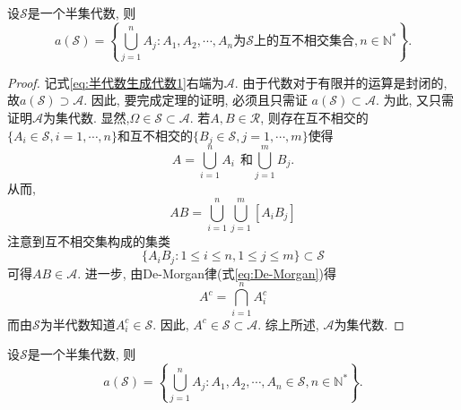 \begin{theorem}\label{thm:半代数生成代数1}
	设$\mathscr{S}$是一个半集代数, 则\begin{equation}\label{eq:半代数生成代数1}
	a(\mathscr{S}) = \left\{ \bigcup_{j=1}^nA_j: A_1,A_2,\cdots,A_n\text{为}\mathscr{S}\text{上的互不相交集合}, n\in\mathbb{N}^*  \right\}.
	\end{equation}
\end{theorem}

\begin{proof}
	记式\ref{eq:半代数生成代数1}右端为$\mathscr{A}$. 
	由于代数对于有限并的运算是封闭的, 故$a(\mathscr{S})\supset \mathscr{A}$. 因此, 要完成定理的证明, 必须且只需证 $a(\mathscr{S})\subset \mathscr{A}$. 为此, 又只需证明$\mathscr{A}$为集代数. 显然,$\Omega\in\mathscr{S}\subset\mathscr{A}$. 若$A,B\in\mathscr{R}$, 则存在互不相交的$\{A_i\in\mathscr{S},i=1,\cdots,n  \}$和互不相交的$\{B_j\in\mathscr{S},j=1,\cdots,m \}$使得
	\begin{equation}
	A = \bigcup_{i=1}^{n}A_i~~\text{和}\bigcup_{j=1}^{m}B_j.
	\end{equation}
	从而, \begin{equation}
		AB = \bigcup_{i=1}^n\bigcup_{j=1}^m[A_iB_j]
	\end{equation}
	注意到互不相交集构成的集类
	\begin{equation}
		\{A_iB_j:1\leqslant i\leqslant n,1\leqslant j\leqslant m\}\subset \mathscr{S}
	\end{equation}
	可得$AB\in\mathscr{A}$. 进一步, 由De-Morgan律(式\ref{eq:De-Morgan})得
	\begin{equation}
		A^c = \bigcap_{i=1}^nA_i^c
	\end{equation}
	而由$\mathscr{S}$为半代数知道$A_i^c\in\mathscr{S}$. 因此, $A^c\in\mathscr{S}\subset\mathscr{A}$. 综上所述, $\mathscr{A}$为集代数.
\end{proof}

\begin{theorem}
	设$\mathscr{S}$是一个半集代数, 则\begin{equation}
	a(\mathscr{S}) = \left\{ \bigcup_{j=1}^nA_j: A_1,A_2,\cdots,A_n\in\mathscr{S}, n\in\mathbb{N}^*  \right\}.
	\end{equation}
\end{theorem}

